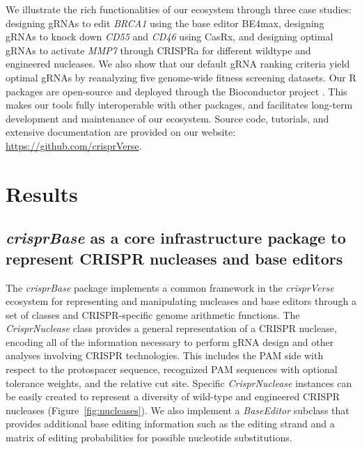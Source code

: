 \documentclass[pdftex,english,10pt]{article}
\begin{document}
We illustrate the rich functionalities of our ecosystem through three case studies: designing gRNAs to edit \textit{BRCA1} using the base editor BE4max, designing gRNAs to knock down \textit{CD55} and \textit{CD46} using CasRx, and designing optimal gRNAs to activate \textit{MMP7} through CRISPRa for different wildtype and engineered nucleases. We also show that our default gRNA ranking criteria yield optimal gRNAs by reanalyzing five genome-wide fitness screening datasets. Our R packages are open-source and deployed through the Bioconductor project \citep{bioc1,bioc2}. This makes our tools fully interoperable with other packages, and facilitates long-term development and maintenance of our ecosystem. Source code, tutorials, and extensive documentation are provided on our website: \url{https://github.com/crisprVerse}.




\section*{Results}


\subsection*{\textit{crisprBase} as a core infrastructure package to represent CRISPR nucleases and base editors}

The \textit{crisprBase} package implements a common framework in the \textit{crisprVerse} ecosystem for representing and manipulating nucleases and base editors through a set of classes and CRISPR-specific genome arithmetic functions. The \textit{CrisprNuclease} class provides a general representation of a CRISPR nuclease, encoding all of the information necessary to perform gRNA design and other analyses involving CRISPR technologies. This includes the PAM side with respect to the protospacer sequence, recognized PAM sequences with optional tolerance weights, and the relative cut site. Specific \textit{CrisprNuclease} instances can be easily created to represent a diversity of wild-type and engineered CRISPR nucleases (Figure~\ref{fig:nucleases}). We also implement a \textit{BaseEditor} subclass that provides additional base editing information such as the editing strand and a matrix of editing probabilities for possible nucleotide substitutions.
\end{document}
